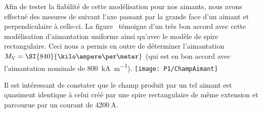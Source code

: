 Afin de tester la fiabilité de cette modélisation pour nos aimants, nous avons effectué des mesures de \chm suivant l'axe passant par la grande face d'un aimant et perpendiculaire à celle-ci. La figure~ témoigne d'un très bon accord avec cette modélisation d'aimantation uniforme ainsi qu'avec le modèle de spire rectangulaire. 
Ceci nous a permis en outre de déterminer l'aimantation $M_{\rm V} = \SI{840}{\kilo\ampere\per\meter}$ (qui est en bon accord avec l'aimantation nominale de \SI{800}{\kilo\ampere\per\meter}). 
%
\bfigh
\texttt{[image: P1/ChampAimant]}
\label{fig:ChampAimant}
\efigh


Il est intéressant de constater que le champ produit par un tel aimant est quasiment identique à celui créé par une spire rectangulaire de même extension et parcourue par un courant de $\SI{4200}{\ampere}$.


